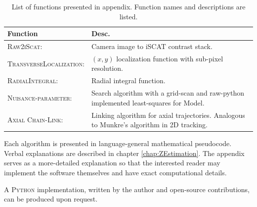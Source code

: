 \begin{table} [h!]
\centering
    \renewcommand{\arraystretch}{1.5} %
    
    \begin{tabularx}{\textwidth}{@{} X X @{}}
        \hline
        Function & Desc. \\
        \hline
        \textsc{Raw2iScat}: &Camera image to iSCAT contrast stack.\\
        \textsc{TransverseLocalization}: & $(x,y)$ localization function with sub-pixel resolution.\\
        \textsc{RadialIntegral}: &Radial integral function.\\
        \textsc{Nuisance-parameter}:& Search algorithm with a grid-scan and raw-python implemented least-squares for Model.\\
        \textsc{Axial Chain-Link}: &Linking algorithm for axial trajectories. Analogous to Munkre's algorithm in 2D tracking.\\
        \hline
    \end{tabularx}
    
    \caption{List of functions presented in appendix. Function names and descriptions are listed.}
    \label{app:funclist}
\end{table}


Each algorithm is presented in language-general mathematical pseudocode. Verbal explanations are described in chapter \ref{chap:ZEstimation}. The appendix serves as a more-detailed explanation so that the interested reader may implement the software themselves and have exact computational details. 

A \textsc{Python} implementation, written by the author and open-source contributions, can be produced upon request. 

\clearpage

